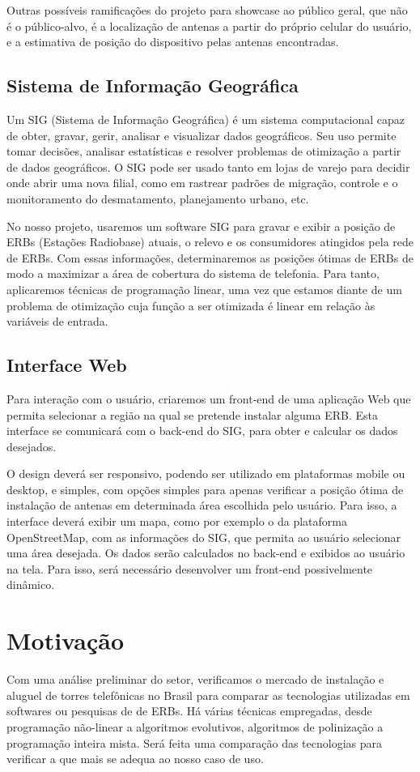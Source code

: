 \documentclass[]{politex}
\begin{document}
Outras possíveis ramificações do projeto para showcase ao público geral, que não
é o público-alvo, é a localização de antenas a partir do próprio celular do
usuário, e a estimativa de posição do dispositivo pelas antenas encontradas.

\subsection{Sistema de Informação Geográfica}
Um SIG (Sistema de Informação Geográfica) é um sistema computacional capaz de
obter, gravar, gerir, analisar e visualizar dados geográficos. Seu uso permite
tomar decisões, analisar estatísticas e resolver problemas de otimização a
partir de dados geográficos. O SIG pode ser usado tanto em lojas de varejo para
decidir onde abrir uma nova filial, como em rastrear padrões de migração,
controle e o monitoramento do desmatamento, planejamento urbano, etc.

No nosso projeto, usaremos um software SIG para gravar e exibir a posição de
ERBs (Estações Radiobase) atuais, o relevo e os consumidores atingidos pela
rede de ERBs. Com essas informações, determinaremos as posições ótimas de
ERBs de modo a maximizar a área de cobertura do sistema de telefonia.
Para tanto, aplicaremos técnicas de programação linear, uma vez que
estamos diante de um problema de otimização cuja função a ser otimizada
é linear em relação às variáveis de entrada.

\subsection{Interface Web}
Para interação com o usuário, criaremos um front-end de uma aplicação Web que
permita selecionar a região na qual se pretende instalar alguma ERB.
Esta interface se comunicará com o back-end do SIG, para obter e calcular os
dados desejados.

O design deverá ser responsivo, podendo ser utilizado em plataformas mobile
ou desktop, e simples, com opções simples para apenas verificar a posição ótima
de instalação de antenas em determinada área escolhida pelo usuário. Para isso,
a interface deverá exibir um mapa, como por exemplo o da plataforma
OpenStreetMap, com as informações do SIG, que permita ao usuário selecionar uma
área desejada. Os dados serão calculados no back-end e exibidos ao usuário na
tela. Para isso, será necessário desenvolver um front-end possivelmente
dinâmico.

\section{Motivação}
Com uma análise preliminar do setor, verificamos o mercado de instalação e
aluguel de torres telefônicas no Brasil para comparar as tecnologias utilizadas
em softwares ou pesquisas de  de ERBs. Há várias técnicas empregadas, desde
programação não-linear a algoritmos evolutivos, algoritmos de polinização a
programação inteira mista. Será feita uma comparação das tecnologias para
verificar a que mais se adequa ao nosso caso de uso.
\end{document}
